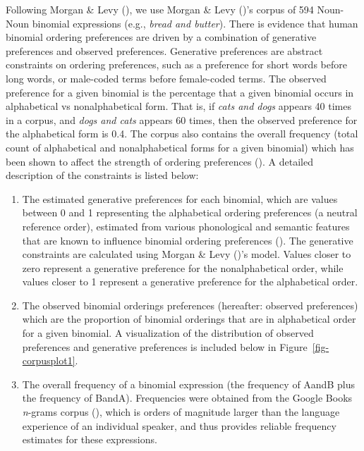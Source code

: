 \documentclass[
  12pt,
  letterpaper,
]{scrreport}
\begin{document}
Following Morgan \& Levy
(), we use Morgan
\& Levy ()'s corpus of 594 Noun-Noun
binomial expressions (e.g., \emph{bread and butter}). There is evidence
that human binomial ordering preferences are driven by a combination of
generative preferences and observed preferences. Generative preferences
are abstract constraints on ordering preferences, such as a preference
for short words before long words, or male-coded terms before
female-coded terms. The observed preference for a given binomial is the
percentage that a given binomial occurs in alphabetical vs
nonalphabetical form. That is, if \emph{cats and dogs} appears 40 times
in a corpus, and \emph{dogs and cats} appears 60 times, then the
observed preference for the alphabetical form is 0.4. The corpus also
contains the overall frequency (total count of alphabetical and
nonalphabetical forms for a given binomial) which has been shown to
affect the strength of ordering preferences
(). A detailed description of the constraints is listed below:

\begin{enumerate}
\def\labelenumi{\arabic{enumi}.}
\item
  The estimated generative preferences for each binomial, which are
  values between 0 and 1 representing the alphabetical ordering
  preferences (a neutral reference order), estimated from various
  phonological and semantic features that are known to influence
  binomial ordering preferences (). The generative constraints are calculated using Morgan
  \& Levy ()'s model. Values closer to
  zero represent a generative preference for the nonalphabetical order,
  while values closer to 1 represent a generative preference for the
  alphabetical order.
\item
  The observed binomial orderings preferences (hereafter: observed
  preferences) which are the proportion of binomial orderings that are
  in alphabetical order for a given binomial. A visualization of the
  distribution of observed preferences and generative preferences is
  included below in Figure~\ref{fig-corpusplot1}.
\item
  The overall frequency of a binomial expression (the frequency of AandB
  plus the frequency of BandA). Frequencies were obtained from the
  Google Books \emph{n}-grams corpus
  (),
  which is orders of magnitude larger than the language experience of an
  individual speaker, and thus provides reliable frequency estimates for
  these expressions.
\end{enumerate}
\end{document}
